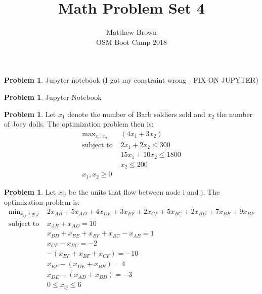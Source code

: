 \documentclass[letterpaper,12pt]{article}
\theoremstyle{definition}
\newtheorem{problem}[theorem]{Problem}
\begin{document}
\title{Math Problem Set 4}
\author{Matthew Brown\\ 
OSM Boot Camp 2018} %
 
\maketitle
 
\begin{problem}{8.1}
Jupyter notebook (I got my constraint wrong - FIX ON JUPYTER)
\end{problem}

\begin{problem}{8.2}
Jupyter Notebook
\end{problem}

\begin{problem}{8.3}
Let $x_1$ denote the number of Barb soldiers sold and $x_2$ the number of Joey dolls. The optimization problem then is:
\begin{align*}
\text{max}_{x_1, x_2} & (4 x_1 + 3 x_2) \\
\text{subject to }
& 2x_1 + 2 x_2 \leq 300 \\
& 15x_1 + 10x_2 \leq 1800 \\
& x_2 \leq 200 \\
x_1, x_2 \geq 0
\end{align*}
\end{problem}

\begin{problem}{8.4}
Let $x_{ij}$ be the units that flow between node i and j. The optimization problem is:
\begin{align*}
\text{min}_{x_{ij}, i \neq j} & 2x_{AB} + 5x_{AD} +4 x_{DE} + 3 x_{EF} + 2 x_{CF} + 5x_{BC} + 2 x_{BD} + 7x_{BE} + 9 x_{BF} \\
\text{subject to }& x_{AB} + x_{AD} = 10\\
& x_{BD} + x_{BE} +x_{BF} + x_{BC} - x_{AB} = 1 \\
& x_{CF} - x_{BC} = -2 \\
& - (x_{EF} + x_{BF} + x_{CF}) = -10 \\
& x_{EF} - (x_{DE} + x_{BE}) = 4 \\
& x_{DE} - (x_{AD} + x_{BD}) = -3 \\
& 0 \leq x_{ij} \leq 6
\end{align*}
\end{problem}
\end{document}

